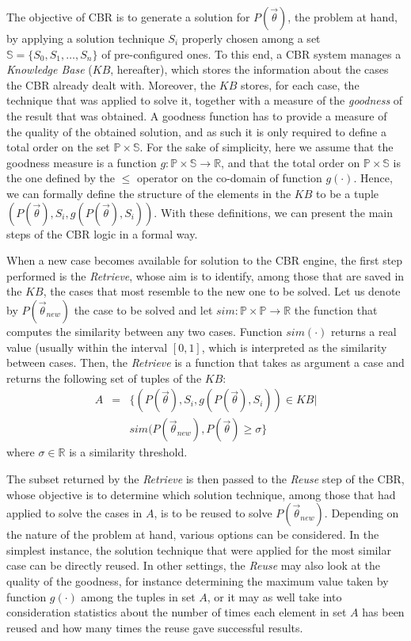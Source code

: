 \documentclass{IEEEtran}
\begin{document}
The objective of CBR is to generate a solution for $P(\vec{\theta})$, the problem at hand, by applying a solution technique $S_i$ properly chosen among a set $\mathbb{S}=\{S_0,S_1,\ldots,S_n\}$ of pre-configured ones. 
To this end, a CBR system manages a {\em Knowledge Base} ($KB$, hereafter), which stores the information about the cases the CBR already dealt with. 
Moreover, the $KB$ stores, for each case,  the technique that was applied to solve it, together with a measure of the {\em goodness} of the result that was obtained. 
A goodness function  has to provide a measure of the quality of the obtained solution, and as such it is only required to define a total order on the set  $\mathbb{P} \times \mathbb{S}$.
For the sake of simplicity, here we assume that the goodness measure is a function 
$g:\mathbb{P} \times \mathbb{S} \rightarrow \mathbb{R}$, and that the total order on   $\mathbb{P} \times \mathbb{S}$ is the one defined by the $\leq$ operator on the co-domain of function $g(\cdot)$. 
Hence, we can formally define the structure of the elements in the $KB$ to be a tuple $(P(\vec{\theta}),S_i,g(P(\vec{\theta}),S_i))$. 
With these definitions, we can present the main steps of  the CBR logic in a formal way. 

When a new case becomes available for solution to the CBR engine, the first step performed is the {\em Retrieve}, whose aim is to identify, among those that are saved in the $KB$, the cases that most resemble to the new one to be solved. 
Let us denote by $ P(\vec{\theta}_{new})$ the case to be solved and let 
$sim : \mathbb{P} \times \mathbb{P} \rightarrow \mathbb{R}$ the function that computes 
the similarity between any two cases. Function $sim(\cdot)$ returns a real value (usually within the interval $[0,1]$, which is interpreted as the similarity between cases. 
Then, the  {\em Retrieve} is a function that takes as argument a case and returns the following set of tuples of the $KB$:
\begin{eqnarray}
A & { } = { } & \{ (P(\vec{\theta}),S_i,g(P(\vec{\theta}),S_i)) \in KB  | \nonumber \\
\label{simset}
& &  sim(P(\vec{\theta}_{new}),P(\vec{\theta}) \geq \sigma \}
\end{eqnarray}
where $\sigma \in \mathbb{R}$ is a similarity threshold.  

The subset returned by the {\em Retrieve}  is then passed to the {\em Reuse} step of the CBR, whose objective is to determine which solution technique, among those that had applied to solve the cases in $A$, is to be reused to solve $P(\vec{\theta}_{new})$. 
Depending on the nature of the problem at hand, various options can be considered. 
In the simplest instance, the solution technique that were applied for the most similar case can be directly reused. In other settings, the {\em Reuse} may also look at the quality of the goodness, for instance determining the maximum value taken by function $g(\cdot)$ among the tuples in set $A$, or it may as well take into consideration  statistics about the number of times each element  in set $A$  has been reused and how many times the reuse gave successful results. 
\end{document}
